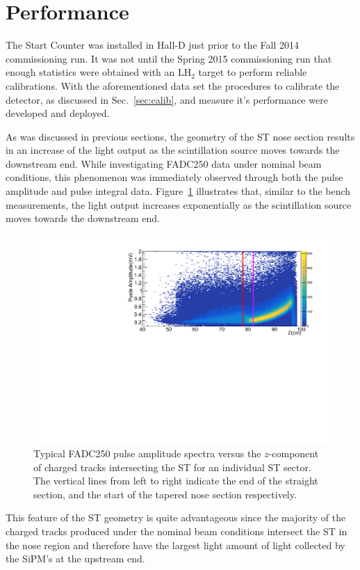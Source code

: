 \section{Performance} \label{sec:perform}

The Start Counter was installed in Hall-D just prior to the Fall 2014 \gx{} commissioning run.  It was not until the Spring 2015 commissioning run that enough statistics were obtained with an $\mathrm{LH_{2}}$ target to perform reliable calibrations.  With the aforementioned data set the procedures to calibrate the detector, as discussed in Sec.~\ref{sec:calib}, and measure it's performance were developed and deployed.

As was discussed in previous sections, the geometry of the ST nose section results in an increase of the light output as the scintillation source moves towards the downstream end.  While investigating FADC250 data under nominal beam conditions, this phenomenon was immediately observed through both the pulse amplitude and pulse integral data. Figure~\ref{fig:pippvszint} illustrates that, similar to the bench measurements, the light output increases exponentially as the scintillation source moves towards the downstream end.
	\begin{figure}[!htb]
		\centering
		\includegraphics[width=1.0\columnwidth]{performance/figs/PA_Z}
		\caption{Typical FADC250 pulse amplitude spectra versus the $z$-component of charged tracks intersecting the ST for an individual ST sector. The vertical lines from left to right indicate the end of the straight section, and the start of the tapered nose section respectively.}
		\label{fig:pippvszint}
	\end{figure}
This feature of the ST geometry is quite advantageous since the majority of the charged tracks produced under the nominal \gx{} beam conditions intersect the ST in the nose region and therefore have the largest light amount of light collected by the SiPM's at the upstream end.

